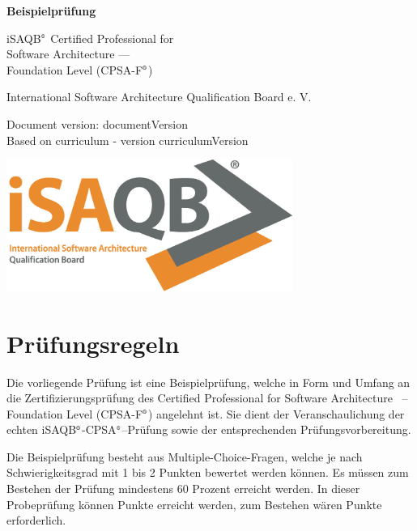 \documentclass[12pt,a4paper]{article}
\newcounter{examQuestionCount}
\newcounter{examTotalPoints}
\newcounter{examMinPoints}
\newcounter{examQuestion}\setcounter{examQuestion}{1}
\newcommand{\registered}{$^\textrm{\tiny\textregistered}$}
\begin{document}
\pagestyle{fancy}

\begin{titlepage}
  \begin{center}
   {\huge\bfseries Beispielprüfung

     iSAQB\registered{} Certified Professional for\\ Software Architecture ---\\[2ex]
     
     Foundation Level (CPSA-F\registered{})}

  \bigskip
  
  {\large International Software Architecture Qualification Board
    e. V.}

  \bigskip

  Document version: {{documentVersion}}\\
  Based on curriculum - version {{curriculumVersion}}
\end{center}

\vspace*{\fill}

\begin{center}
  \includegraphics[width=0.7\textwidth]{isaqb-logo}
\end{center}
\end{titlepage}

\section*{Prüfungsregeln}

Die vorliegende Prüfung ist eine Beispielprüfung, welche in Form und
Umfang an die Zertifizierungsprüfung des Certified Professional for
Software Architecture ~-- Foundation Level (CPSA-F\registered{})
angelehnt ist. Sie dient der Veranschaulichung der echten
iSAQB\registered{}-CPSA\registered{}--Prüfung sowie der entsprechenden
Prüfungsvorbereitung.

Die Beispielprüfung besteht aus \theexamQuestionCount{} Multiple-Choice-Fragen, welche je
nach Schwierigkeitsgrad mit 1 bis 2 Punkten bewertet werden können. Es
müssen zum Bestehen der Prüfung mindestens 60 Prozent erreicht
werden. In dieser Probeprüfung können \theexamTotalPoints{} Punkte erreicht werden, zum
Bestehen wären \theexamMinPoints{} Punkte erforderlich.
\end{document}
